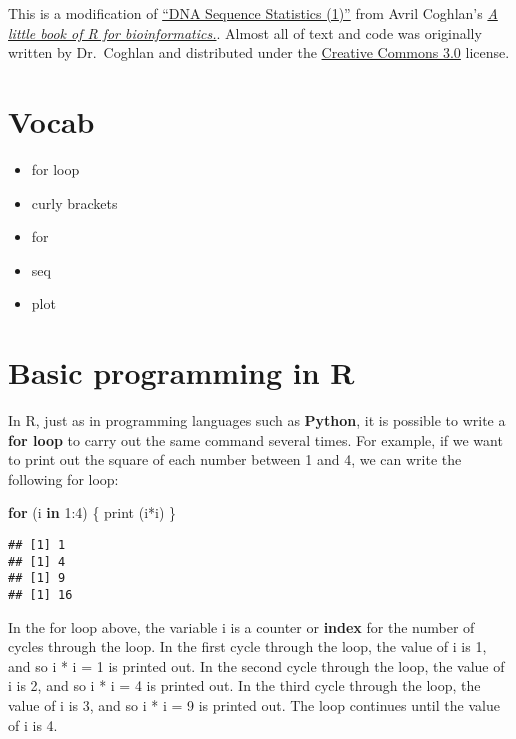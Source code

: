 \documentclass[
]{book}
\newenvironment{Shaded}{\begin{snugshade}}{\end{snugshade}}
\newcommand{\ControlFlowTok}[1]{\textcolor[rgb]{0.13,0.29,0.53}{\textbf{#1}}}
\newcommand{\DecValTok}[1]{\textcolor[rgb]{0.00,0.00,0.81}{#1}}
\newcommand{\FunctionTok}[1]{\textcolor[rgb]{0.00,0.00,0.00}{#1}}
\newcommand{\NormalTok}[1]{#1}
\newcommand{\SpecialCharTok}[1]{\textcolor[rgb]{0.00,0.00,0.00}{#1}}
\begin{document}
This is a modification of \href{https://a-little-book-of-r-for-bioinformatics.readthedocs.io/en/latest/src/chapter1.html}{``DNA Sequence Statistics (1)''} from Avril Coghlan's \href{https://a-little-book-of-r-for-bioinformatics.readthedocs.io/en/latest/index.html}{\emph{A little book of R for bioinformatics.}}. Almost all of text and code was originally written by Dr.~Coghlan and distributed under the \href{https://creativecommons.org/licenses/by/3.0/us/}{Creative Commons 3.0} license.

\hypertarget{vocab}{%
\section{Vocab}\label{vocab}}

\begin{itemize}
\item
  for loop
\item
  curly brackets
\item
  for
\item
  seq
\item
  plot
\end{itemize}

\hypertarget{basic-programming-in-r}{%
\section{Basic programming in R}\label{basic-programming-in-r}}

In R, just as in programming languages such as \textbf{Python}, it is possible to write a \textbf{for loop} to carry out the same command several times. For example, if we want to print out the square of each number between 1 and 4, we can write the following for loop:

\begin{Shaded}
\begin{Highlighting}[]
\ControlFlowTok{for}\NormalTok{ (i }\ControlFlowTok{in} \DecValTok{1}\SpecialCharTok{:}\DecValTok{4}\NormalTok{) \{ }
  \FunctionTok{print}\NormalTok{ (i}\SpecialCharTok{*}\NormalTok{i) }
\NormalTok{  \}}
\end{Highlighting}
\end{Shaded}

\begin{verbatim}
## [1] 1
## [1] 4
## [1] 9
## [1] 16
\end{verbatim}

In the for loop above, the variable i is a counter or \textbf{index} for the number of cycles through the loop. In the first cycle through the loop, the value of i is 1, and so i * i = 1 is printed out. In the second cycle through the loop, the value of i is 2, and so i * i = 4 is printed out. In the third cycle through the loop, the value of i is 3, and so i * i = 9 is printed out. The loop continues until the value of i is 4.
\end{document}

